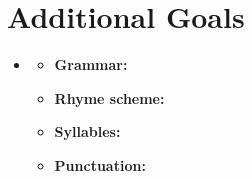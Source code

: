 
\section{Additional Goals}
\medskip
\begin{itemize}

    \item {}

    \begin{itemize}
    \item \textbf{Grammar:}
    \item \textbf{Rhyme scheme:}
    \item \textbf{Syllables:}
    \item \textbf{Punctuation:}
    \end{itemize}

\end{itemize}


